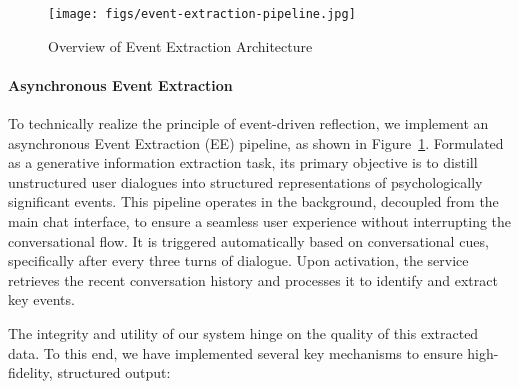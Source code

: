 \begin{figure}[!b]
    \centering
    \texttt{[image: figs/event-extraction-pipeline.jpg]}
    \caption{Overview of Event Extraction Architecture}
    \label{fig:event-pipeline}
\end{figure}

\paragraph{Asynchronous Event Extraction}

To technically realize the principle of event-driven reflection, we implement an asynchronous Event Extraction (EE) pipeline, as shown in Figure~\ref{fig:event-pipeline}. Formulated as a generative information extraction task\cite{xu2023large}, its primary objective is to distill unstructured user dialogues into structured representations of psychologically significant events. This pipeline operates in the background, decoupled from the main chat interface, to ensure a seamless user experience without interrupting the conversational flow. It is triggered automatically based on conversational cues, specifically after every three turns of dialogue. Upon activation, the service retrieves the recent conversation history and processes it to identify and extract key events.

The integrity and utility of our system hinge on the quality of this extracted data. To this end, we have implemented several key mechanisms to ensure high-fidelity, structured output:

